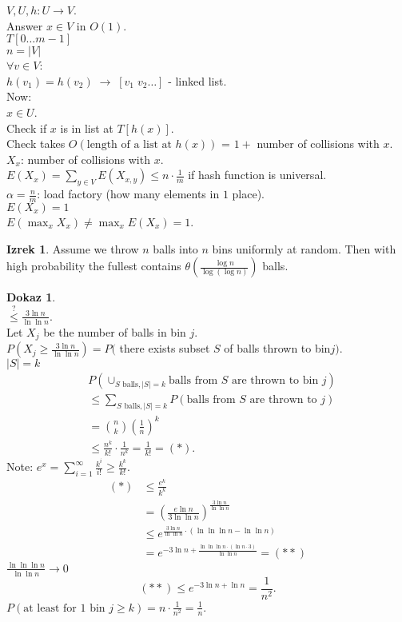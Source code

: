 \documentclass[a4paper, 12pt]{book}
\theoremstyle{definition}
\newtheorem{theorem}[counter]{Izrek}
\newtheorem{pro}[counter]{Dokaz}
\theoremstyle{remark}
\begin{document}
$V, U, h: U \to V$. \\
Answer $x \in V$ in $O(1)$. \\
$T[0 \dots m-1]$ \\
$n = |V|$ \\
$\forall v \in V$: \\
$h(v_1) = h(v_2) \; \to \; [v_1 \; v_2 \dots]$ - linked list. \\
Now: \\
$x \in U$. \\
Check if $x$ is in list at $T[h(x)]$. \\
Check takes $O(\text{length of a list at }h(x))$ = $1 +$ number of collisions with $x$. \\
$X_x$: number of collisions with $x$. \\
$E(X_x) = \sum_{y \in V} E(X_{x,y}) \leq n \cdot \frac{1}{m}$ if hash function is universal. \\
$\alpha = \frac{n}{m}$: load factory (how many elements in $1$ place). \\
$E(X_x) = 1$ \\
$E(\max_x X_x) \neq \max_x E(X_x) = 1$.
\begin{theorem}
  Assume we throw $n$ balls into $n$ bins uniformly at random.
  Then with high probability the fullest contains
  $\theta\left(\frac{\log n}{\log (\log n)}\right)$ balls.
\end{theorem}
\begin{pro} \text{} \\
  $\stackrel{?}{\leq} \frac{3 \ln n}{\ln \ln n}$. \\
  Let $X_j$ be the number of balls in bin $j$. \\
  $P\left(X_j \geq \frac{3 \ln n}{\ln \ln n}\right) = P($ there exists subset $S$ of balls thrown to bin$j)$. \\
  $|S| = k$
  \begin{align*}
    &P\left(\cup_{S \text{ balls}, |S|=k} \text{balls from $S$ are thrown to bin }j\right) \\
    &\leq \sum_{S \text{ balls}, |S|=k} P(\text{balls from $S$ are thrown to }j) \\
    &= \binom{n}{k} \left(\frac{1}{n}\right)^k \\
    &\leq \frac{n^k}{k!} \cdot \frac{1}{n^k} = \frac{1}{k!} = (*).
  \end{align*}
  Note: $e^x = \sum_{i=1}^{\infty} \frac{k^i}{i!} \geq \frac{k^k}{k!}$.
  \begin{align*}
    (*)& \leq \frac{e^k}{k^k} \\
    &= \left(\frac{e \ln n}{3 \ln \ln n}\right)^{\frac{3 \ln n}{\ln \ln n}} \\
    &\leq e^{\frac{3 \ln n}{\ln \ln n} \cdot \left(\ln \ln \ln n - \ln \ln n\right)} \\
    &= e^{-3 \ln n + \frac{\ln \ln \ln n \cdot (\ln n \cdot 3)}{\ln \ln n}} = (**)
  \end{align*}
  $\frac{\ln \ln \ln n}{\ln \ln n} \to 0$
  \begin{equation*}
    (**) \leq e^{-3 \ln n + \ln n} = \frac{1}{n^2}.
  \end{equation*}
  $P(\text{at least for $1$ bin }j \geq k) = n \cdot \frac{1}{n^2} = \frac{1}{n}$.
\end{pro}
\end{document}
